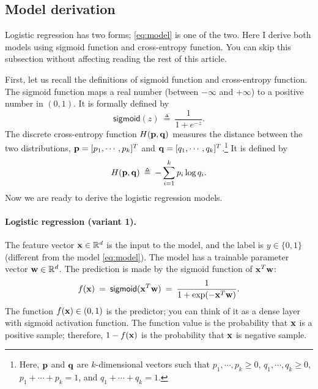 \documentclass[11pt]{article}
\numberwithin{equation}{section}
\def\pp{{\bf p}}
\def\q{{\bf q}}
\def\w{{\bf w}}
\def\x{{\bf x}}
\def\RB{{\mathbb R}}
\def\sigmoid{\mathsf{sigmoid}}
\begin{document}
\subsection{Model derivation}


Logistic regression has two forms; \eqref{eq:model} is one of the two.
Here I derive both models using sigmoid function and cross-entropy function.
You can skip this subsection without affecting reading the rest of this article.


First, let us recall the definitions of sigmoid function and cross-entropy function.
The sigmoid function maps a real number (between $-\infty$ and $+\infty$) to a positive number in $(0, 1)$.
It is formally defined by 
\begin{equation*}
\sigmoid (z) 
\: \triangleq \: \frac{1}{ 1 + e^{-z} } .
\end{equation*}
The discrete cross-entropy function $H (\pp , \q )$ measures the distance between the two distributions, 
$\pp = [p_1, \cdots , p_k]^T$ and $\q= [q_1, \cdots , q_k]^T$.\footnote{Here, $\pp$ and $\q$ are $k$-dimensional vectors such that $p_1 , \cdots , p_k \geq 0$, $q_1 , \cdots , q_k \geq 0$, $p_1 + \cdots + p_k =1$, and $q_1 + \cdots + q_k =1$.}
It is defined by
\begin{equation*}
H (\pp, \q ) 
\: \triangleq \: - \sum_{i=1}^k p_i \log q_i .
\end{equation*}
Now we are ready to derive the logistic regression models.



\paragraph{Logistic regression (variant 1).}
The feature vector $\x \in \RB^d$ is the input to the model,
and the label is $y \in \{0, 1\}$ (different from the model \eqref{eq:model}).
The model has a trainable parameter vector $\w \in \RB^d$.
The prediction is made by the sigmoid function of $\x^T \w$:
\begin{equation*}
f (\x)
\: = \:
\sigmoid ( \x^T \w ) 
\: = \: \frac{1}{ 1 + \exp (-\x^T \w ) } .
\end{equation*}
The function $f( \x) \in (0, 1)$ is the predictor;
you can think of it as a dense layer with sigmoid activation function.
The function value is the probability that $\x$ is a positive sample;
therefore, $1 - f(\x)$ is the probability that $\x$ is negative sample.
\end{document}
